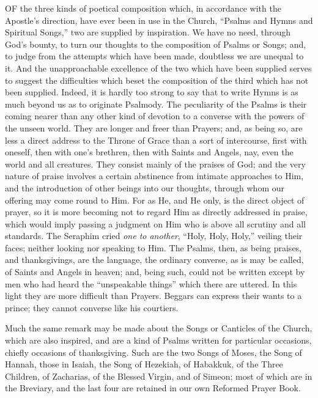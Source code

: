 

OF the three kinds of poetical composition which, in accordance
with the Apostle's direction, have ever been in use in the Church, ``Psalms
and Hymns and Spiritual Songs,'' two are supplied by inspiration. We
have no need, through God's bounty, to turn our thoughts to the
composition of Psalms or Songs; and, to judge from the attempts which
have been made, doubtless we are unequal to it. And the unapproachable
excellence of the two which have been supplied serves to suggest the
difficulties which beset the composition of the third which has not
been supplied. Indeed, it is hardly too strong to say that to write
Hymns is as much beyond us as to originate Psalmody. The peculiarity
of the Psalms is their coming nearer than any other kind of devotion
to a converse with the powers of the unseen world. They are longer and
freer than Prayers; and, as being so, are less a direct address
to the Throne of Grace than a sort of intercourse, first with oneself,
then with one's brethren, then with Saints and Angels, nay, even the
world and all creatures. They consist mainly of the praises of God;
and the very nature of praise involves a certain abstinence from
intimate approaches to Him, and the introduction of other beings into
our thoughts, through whom our offering may come round to Him. For as
He, and He only, is the direct object of prayer, so it is more
becoming not to regard Him as directly addressed in praise, which
would imply passing a judgment on Him who is above all scrutiny and
all standards. The Seraphim cried \emph{one to another}, ``Holy, Holy,
Holy,'' veiling their faces; neither looking nor speaking to Him. The
Psalms, then, as being praises, and thanksgivings, are the language,
the ordinary converse, as is may be called, of Saints and Angels in
heaven; and, being such, could not be written except by men who had
heard the ``unspeakable things'' which there are uttered. In this light
they are more difficult than Prayers. Beggars can express their wants
to a prince; they cannot converse like his courtiers.

Much the same remark may be made about the Songs
or Canticles of the Church, which are also inspired, and are a kind of
Psalms written for particular occasions, chiefly occasions of
thanksgiving. Such are the two Songs of Moses, the Song of Hannah,
those in Isaiah, the Song of Hezekiah, of Habakkuk, of the Three
Children, of Zacharias, of the Blessed Virgin, and of Simeon; most of
which are in the Breviary, and the last four are retained in our own
Reformed Prayer Book.

